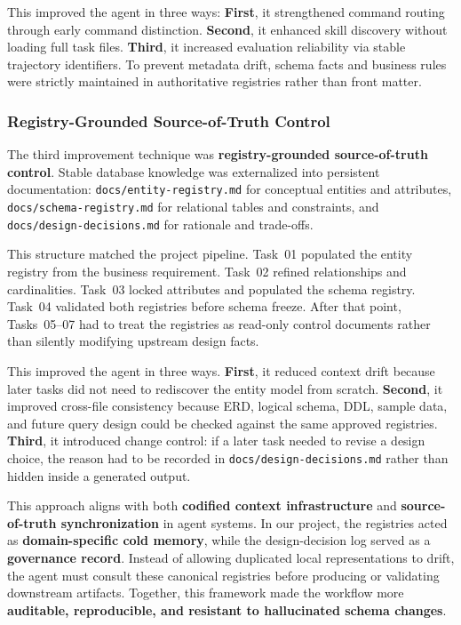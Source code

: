 This improved the agent in three ways: \textbf{First}, it strengthened command routing through early command distinction. \textbf{Second}, it enhanced skill discovery without loading full task files. \textbf{Third}, it increased evaluation reliability via stable trajectory identifiers. To prevent metadata drift, schema facts and business rules were strictly maintained in authoritative registries rather than front matter.

\subsubsection{Registry-Grounded Source-of-Truth Control}
The third improvement technique was \textbf{registry-grounded source-of-truth control}. Stable database knowledge was externalized into persistent documentation: \texttt{docs/entity-registry.md} for conceptual entities and attributes, \texttt{docs/schema-registry.md} for relational tables and constraints, and \texttt{docs/design-decisions.md} for rationale and trade-offs.

This structure matched the project pipeline. Task~01 populated the entity registry from the business requirement. Task~02 refined relationships and cardinalities. Task~03 locked attributes and populated the schema registry. Task~04 validated both registries before schema freeze. After that point, Tasks~05--07 had to treat the registries as read-only control documents rather than silently modifying upstream design facts.

This improved the agent in three ways. \textbf{First}, it reduced context drift because later tasks did not need to rediscover the entity model from scratch. \textbf{Second}, it improved cross-file consistency because ERD, logical schema, DDL, sample data, and future query design could be checked against the same approved registries. \textbf{Third}, it introduced change control: if a later task needed to revise a design choice, the reason had to be recorded in \texttt{docs/design-decisions.md} rather than hidden inside a generated output.

This approach aligns with both \textbf{codified context infrastructure} and \textbf{source-of-truth synchronization} in agent systems. In our project, the registries acted as \textbf{domain-specific cold memory}, while the design-decision log served as a \textbf{governance record}. Instead of allowing duplicated local representations to drift, the agent must consult these canonical registries before producing or validating downstream artifacts. Together, this framework made the workflow more \textbf{auditable, reproducible, and resistant to hallucinated schema changes}.

